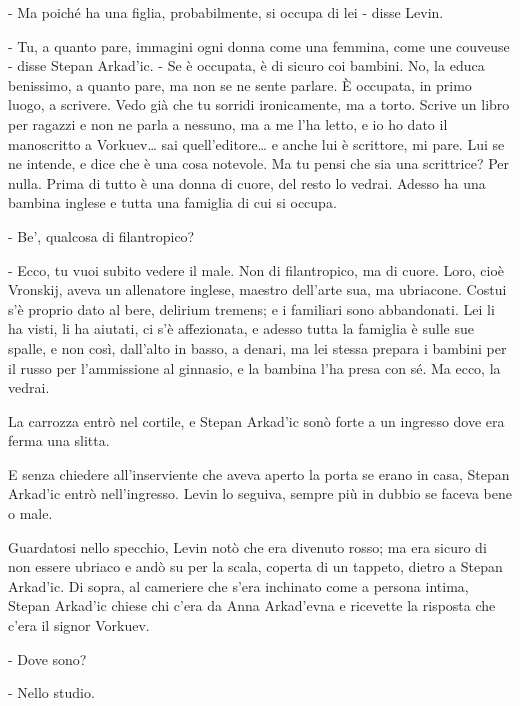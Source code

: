 - Ma poiché ha una figlia, probabilmente, si occupa di lei - disse Levin. 

- Tu, a quanto pare, immagini ogni donna come una femmina, come une couveuse - disse Stepan Arkad'ic. - Se è occupata, è di sicuro coi bambini. No, la educa benissimo, a quanto pare, ma non se ne sente parlare. È occupata, in primo luogo, a scrivere. Vedo già che tu sorridi ironicamente, ma a torto. Scrive un libro per ragazzi e non ne parla a nessuno, ma a me l'ha letto, e io ho dato il manoscritto a Vorkuev\ldots{} sai quell'editore\ldots{} e anche lui è scrittore, mi pare. Lui se ne intende, e dice che è una cosa notevole. Ma tu pensi che sia una scrittrice? Per nulla. Prima di tutto è una donna di cuore, del resto lo vedrai. Adesso ha una bambina inglese e tutta una famiglia di cui si occupa. 

- Be', qualcosa di filantropico? 

- Ecco, tu vuoi subito vedere il male. Non di filantropico, ma di cuore. Loro, cioè Vronskij, aveva un allenatore inglese, maestro dell'arte sua, ma ubriacone. Costui s'è proprio dato al bere, delirium tremens; e i familiari sono abbandonati. Lei li ha visti, li ha aiutati, ci s'è affezionata, e adesso tutta la famiglia è sulle sue spalle, e non così, dall'alto in basso, a denari, ma lei stessa prepara i bambini per il russo per l'ammissione al ginnasio, e la bambina l'ha presa con sé. Ma ecco, la vedrai. 

La carrozza entrò nel cortile, e Stepan Arkad'ic sonò forte a un ingresso dove era ferma una slitta. 

E senza chiedere all'inserviente che aveva aperto la porta se erano in casa, Stepan Arkad'ic entrò nell'ingresso. Levin lo seguiva, sempre più in dubbio se faceva bene o male. 

Guardatosi nello specchio, Levin notò che era divenuto rosso; ma era sicuro di non essere ubriaco e andò su per la scala, coperta di un tappeto, dietro a Stepan Arkad'ic. Di sopra, al cameriere che s'era inchinato come a persona intima, Stepan Arkad'ic chiese chi c'era da Anna Arkad'evna e ricevette la risposta che c'era il signor Vorkuev. 

- Dove sono? 

- Nello studio. 

